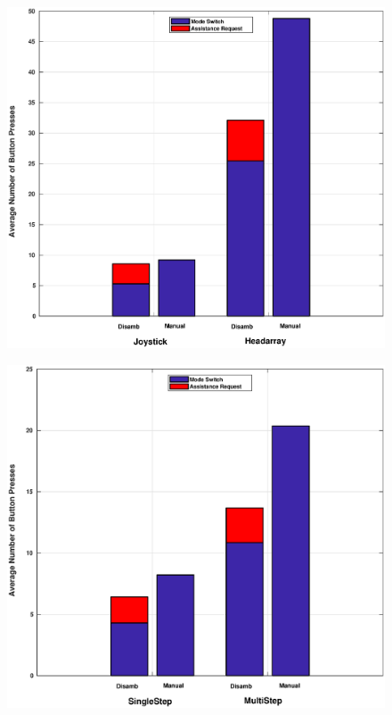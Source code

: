 \begin{figure}[h]
	\centering
	\includegraphics[width = 1.1\hsize ,center]{./figures/button_presses_average.eps}
	\caption{}
	\label{fig:button_press_inter}
\end{figure}

\begin{figure}[h]
	\centering
	\includegraphics[width = 1.1\hsize ,center]{./figures/button_presses_average_tasks.eps}
	\caption{}
	\label{fig:button_press_task}
\end{figure}
